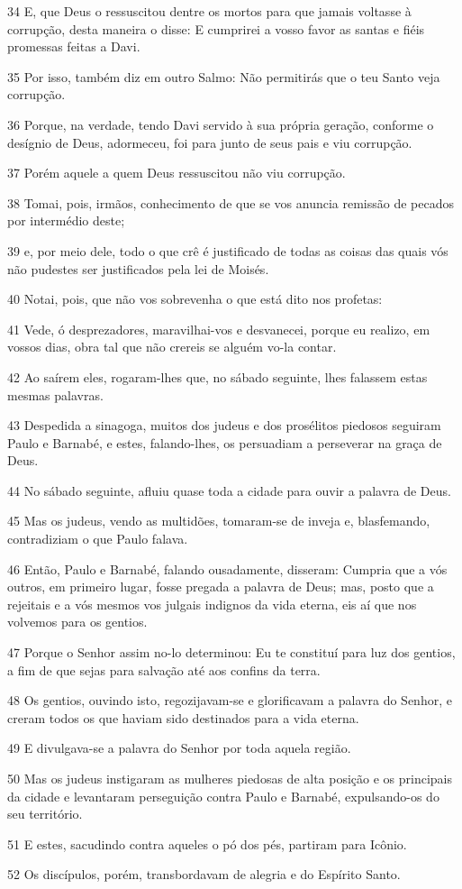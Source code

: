\par 34 E, que Deus o ressuscitou dentre os mortos para que jamais voltasse à corrupção, desta maneira o disse: E cumprirei a vosso favor as santas e fiéis promessas feitas a Davi.
\par 35 Por isso, também diz em outro Salmo: Não permitirás que o teu Santo veja corrupção.
\par 36 Porque, na verdade, tendo Davi servido à sua própria geração, conforme o desígnio de Deus, adormeceu, foi para junto de seus pais e viu corrupção.
\par 37 Porém aquele a quem Deus ressuscitou não viu corrupção.
\par 38 Tomai, pois, irmãos, conhecimento de que se vos anuncia remissão de pecados por intermédio deste;
\par 39 e, por meio dele, todo o que crê é justificado de todas as coisas das quais vós não pudestes ser justificados pela lei de Moisés.
\par 40 Notai, pois, que não vos sobrevenha o que está dito nos profetas:
\par 41 Vede, ó desprezadores, maravilhai-vos e desvanecei, porque eu realizo, em vossos dias, obra tal que não crereis se alguém vo-la contar.
\par 42 Ao saírem eles, rogaram-lhes que, no sábado seguinte, lhes falassem estas mesmas palavras.
\par 43 Despedida a sinagoga, muitos dos judeus e dos prosélitos piedosos seguiram Paulo e Barnabé, e estes, falando-lhes, os persuadiam a perseverar na graça de Deus.
\par 44 No sábado seguinte, afluiu quase toda a cidade para ouvir a palavra de Deus.
\par 45 Mas os judeus, vendo as multidões, tomaram-se de inveja e, blasfemando, contradiziam o que Paulo falava.
\par 46 Então, Paulo e Barnabé, falando ousadamente, disseram: Cumpria que a vós outros, em primeiro lugar, fosse pregada a palavra de Deus; mas, posto que a rejeitais e a vós mesmos vos julgais indignos da vida eterna, eis aí que nos volvemos para os gentios.
\par 47 Porque o Senhor assim no-lo determinou: Eu te constituí para luz dos gentios, a fim de que sejas para salvação até aos confins da terra.
\par 48 Os gentios, ouvindo isto, regozijavam-se e glorificavam a palavra do Senhor, e creram todos os que haviam sido destinados para a vida eterna.
\par 49 E divulgava-se a palavra do Senhor por toda aquela região.
\par 50 Mas os judeus instigaram as mulheres piedosas de alta posição e os principais da cidade e levantaram perseguição contra Paulo e Barnabé, expulsando-os do seu território.
\par 51 E estes, sacudindo contra aqueles o pó dos pés, partiram para Icônio.
\par 52 Os discípulos, porém, transbordavam de alegria e do Espírito Santo.

